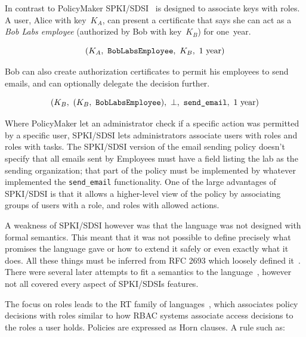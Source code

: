 \documentclass[thesis.tex]{subfiles}
\begin{document}

In contrast to PolicyMaker SPKI/SDSI~\cite{ellison_spki_1999} is
designed to associate keys with roles.  A user, Alice with key~$K_A$,
can present a certificate that says she can act as a \emph{Bob Labs
employee} (authorized by Bob with key~$K_B$) for one~year.

\begin{equation*}
  (K_A,~\text{\tt BobLabsEmployee},~K_B,~1~\text{year})
\end{equation*}

Bob can also create authorization certificates to permit his employees
to send emails, and can optionally delegate the decision further.

\begin{equation*}
 (K_B,~(K_B,~\text{\tt BobLabsEmployee}),~\bot,~\text{\ttfamily send\_email},~1~\text{year})
\end{equation*}

Where PolicyMaker let an administrator check if a specific action was
permitted by a specific user, SPKI/SDSI lets administrators associate
users with roles and roles with tasks.  The SPKI/SDSI version of the
email sending policy doesn't specify that all emails sent by Employees
must have a field listing the lab as the sending organization; that
part of the policy must be implemented by whatever implemented the
\texttt{send\_email} functionality.  One of the large advantages of
SPKI/SDSI is that it allows a higher-level view of the policy by
associating groups of users with a role, and roles with allowed
actions.

A weakness of SPKI/SDSI however was that the language was not designed
with formal semantics.  This meant that it was not possible to define
precisely what promises the language gave or how to extend it safely
or even exactly what it does.  All these things must be inferred from
RFC 2693 which loosely defined it~\cite{ellison_spki_1999}. There were
several later attempts to fit a semantics to the
language~\cite{joseph_y._halpern_logic_1999,abadi_sdsis_1998,howell_formal_2000},
however not all covered every aspect of SPKI/SDSIs features.

The focus on roles leads to the RT family of
languages~\cite{ninghui_li_design_2002}, which associates policy
decisions with roles similar to how \ac{RBAC} systems associate access
decisions to the roles a user holds.  Policies are expressed as Horn
clauses.  A rule such as:
\end{document}
